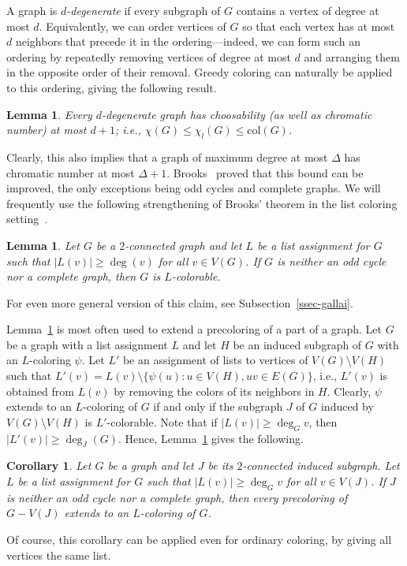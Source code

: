 \documentclass[12pt,twoside,openright,a4paper]{book}
\newtheorem{lemma}[theorem]{Lemma}
\newtheorem{corollary}[theorem]{Corollary}
\newcommand{\col}{\text{col}}
\begin{document}
A graph is \emph{$d$-degenerate} if every subgraph of $G$ contains a vertex of degree at most $d$.
Equivalently, we can order vertices of $G$ so that each vertex has at most $d$ neighbors that precede it in the
ordering---indeed, we can form such an ordering by repeatedly removing vertices of degree at most $d$ and
arranging them in the opposite order of their removal.
Greedy coloring can naturally be applied to this ordering, giving the following result.
\begin{lemma}\label{lemma:degen}
Every $d$-degenerate graph has choosability (as well as chromatic number) at most $d+1$; i.e., $\chi(G)\le\chi_l(G)\le \col(G)$.
\end{lemma}

Clearly, this also implies that a graph of maximum degree at most $\Delta$ has chromatic number
at most $\Delta+1$.  Brooks~\cite{brooks1941colouring} proved that this bound can be improved, the only exceptions
being odd cycles and complete graphs.  We will frequently use the following strengthening of Brooks' theorem
in the list coloring setting~\cite{galfor}.
\begin{lemma}\label{lemma:gallai1}
Let $G$ be a $2$-connected graph and let $L$ be a list assignment for $G$ such that $|L(v)|\ge \deg(v)$ for all $v\in V(G)$.
If $G$ is neither an odd cycle nor a complete graph, then $G$ is $L$-colorable.
\end{lemma}
For even more general version of this claim, see Subsection~\ref{ssec-gallai}.

Lemma~\ref{lemma:gallai1} is most often used to extend a precoloring of a part of a graph.
Let $G$ be a graph with a list assignment $L$ and let $H$ be an induced subgraph of $G$ with an $L$-coloring $\psi$.
Let $L'$ be an assignment of lists to vertices of $V(G)\setminus V(H)$ such that $L'(v)=L(v)\setminus \{\psi(u):u\in V(H),uv\in E(G)\}$,
i.e., $L'(v)$ is obtained from $L(v)$ by removing the colors of its neighbors in $H$.  Clearly, $\psi$ extends to an $L$-coloring of $G$
if and only if the subgraph $J$ of $G$ induced by $V(G)\setminus V(H)$ is $L'$-colorable.  Note that if $|L(v)|\ge \deg_G v$, then
$|L'(v)|\ge \deg_J(G)$.  Hence, Lemma~\ref{lemma:gallai1} gives the following.
\begin{corollary}\label{cor:gallai1}
Let $G$ be a graph and let $J$ be its $2$-connected induced subgraph.  Let $L$ be a list assignment for $G$ such that $|L(v)|\ge \deg_G v$ for all $v\in V(J)$.
If $J$ is neither an odd cycle nor a complete graph, then every precoloring of $G-V(J)$ extends to an $L$-coloring of $G$.
\end{corollary}
Of course, this corollary can be applied even for ordinary coloring, by giving all vertices the same list.
\end{document}
